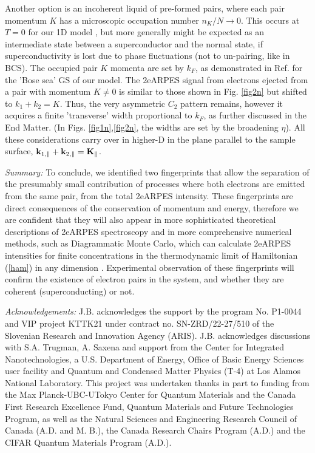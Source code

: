 \documentclass[prl,twocolumn,showpacs,amsmath,amssymb,superscriptaddress,floatfix]{revtex4}
\begin{document}
Another option is an incoherent liquid of pre-formed pairs,  where each pair momentum $K$ has a microscopic occupation number $n_K/N\rightarrow 0$. This occurs at $T=0$  for our 1D model \cite{Klemen2025}, but more generally might be expected as an intermediate state between a superconductor and the normal state, if superconductivity is lost due to phase fluctuations (not to un-pairing, like in BCS). The occupied pair $K$ momenta are set by $k_F$, as demonstrated in Ref. \cite{Klemen2025} for the 'Bose sea' GS of our model. The 2eARPES signal from electrons ejected from a pair with momentum $K\ne 0$ is similar to those shown in Fig. \ref{fig2n} but shifted to $k_1+k_2=K$. Thus, the very asymmetric $C_2$ pattern remains, however it acquires a finite 'transverse' width proportional to $k_F$, as further discussed in the End Matter.  (In  Figs. \ref{fig1n},\ref{fig2n}, the widths are set by the  broadening $\eta$). All these considerations carry over in higher-D in the plane parallel to the sample surface,  ${\bf k}_{1,\parallel}+{\bf k}_{2,\parallel}={\bf K}_{\parallel}$.

{\em Summary:}  To conclude, we identified two fingerprints that allow the separation of the presumably small contribution of processes where both electrons are emitted from the same pair, from the total 2eARPES intensity. These fingerprints are direct consequences of the conservation of momentum and energy, therefore we are confident that they will also appear in more sophisticated theoretical descriptions of 2eARPES spectroscopy and in more comprehensive numerical methods, such as Diagrammatic Monte Carlo, which can calculate 2eARPES intensities for finite concentrations in the thermodynamic limit of Hamiltonian (\ref{ham}) in any dimension \cite{Burovski2008,Mishchenko2014,Tupitsyn2016,Mishchenko2018}. Experimental observation of these fingerprints will confirm the existence of electron pairs in the system, and whether they are coherent (superconducting) or not.

{\em Acknowledgements:} J.B. acknowledges the support by the program No. P1-0044 and   VIP project KTTK21 under contract no. SN-ZRD/22-27/510 of the Slovenian Research and Innovation Agency (ARIS). J.B.  acknowledges  discussions with S.A. Trugman, A. Saxena and support from  the Center for Integrated Nanotechnologies, a U.S. Department of Energy, Office of Basic Energy Sciences user facility and Quantum and Condensed Matter Physics  (T-4) at Los Alamos National Laboratory. This project was undertaken thanks in part to funding from the Max Planck-UBC-UTokyo Center for
Quantum Materials and the Canada First Research Excellence Fund, Quantum Materials and Future Technologies Program, as well as the  Natural Sciences and Engineering Research Council of Canada (A.D. and M. B.), the Canada Research Chairs Program (A.D.) and the CIFAR Quantum Materials Program (A.D.).
\end{document}
